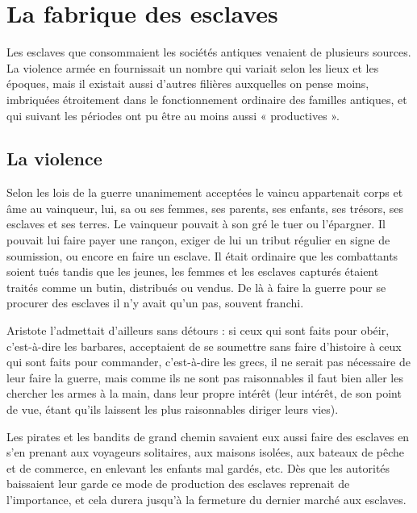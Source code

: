 \section{La fabrique des esclaves}

Les esclaves que consommaient les sociétés antiques venaient de
plusieurs sources. La violence armée en fournissait un nombre qui variait
selon les lieux et les époques, mais il existait aussi d'autres filières auxquelles
on pense moins, imbriquées étroitement dans le fonctionnement
ordinaire des familles antiques, et qui suivant les périodes ont pu être au
moins aussi « productives ».

\subsection{La violence}

Selon les lois de la guerre unanimement acceptées le vaincu appartenait
corps et âme au vainqueur, lui, sa ou ses femmes, ses parents, ses
enfants, ses trésors, ses esclaves et ses terres. Le vainqueur pouvait à son
gré le tuer ou l'épargner. Il pouvait lui faire payer une rançon, exiger de
lui un tribut régulier en signe de soumission, ou encore en faire un esclave.
Il était ordinaire que les combattants soient tués tandis que les jeunes,
les femmes et les esclaves capturés étaient traités comme un butin, distribués
ou vendus. De là à faire la guerre pour se procurer des esclaves il
n'y avait qu'un pas, souvent franchi.

Aristote l'admettait d'ailleurs sans détours : si ceux qui sont faits
pour obéir, c'est-à-dire les barbares, acceptaient de se soumettre sans faire
d'histoire à ceux qui sont faits pour commander, c'est-à-dire les grecs,
il ne serait pas nécessaire de leur faire la guerre, mais comme ils ne sont
pas raisonnables il faut bien aller les chercher les armes à la main, dans
leur propre intérêt (leur intérêt, de son point de vue, étant qu'ils laissent
les plus raisonnables diriger leurs vies).

Les pirates et les bandits de grand chemin savaient eux aussi faire
des esclaves en s'en prenant aux voyageurs solitaires, aux maisons isolées,
aux bateaux de pêche et de commerce, en enlevant les enfants mal
gardés, etc. Dès que les autorités baissaient leur garde ce mode de production
des esclaves reprenait de l'importance, et cela durera jusqu'à la
fermeture du dernier marché aux esclaves.

